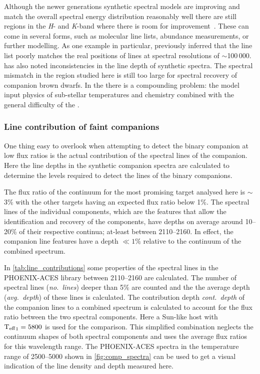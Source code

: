 
Although the newer generations synthetic spectral models are improving and match the overall spectral energy distribution reasonably well there are still regions in the \emph{H}- and \emph{K}-band where there is room for improvement~\citet{rajpurohit_spectral_2016}.
These can come in several forms, such as molecular line lists, abundance measurements, or further modelling.
As one example in particular, \citet{rajpurohit_spectral_2016} previously inferred that the  line list poorly matches the real positions of  lines at spectral resolutions of \(\sim\)100\,000.
\citet{passegger_carmenes_2018} has also noted inconsistencies in the line depth of synthetic spectra.
The spectral mismatch in the region studied here is still too large for spectral recovery of companion brown dwarfs.
In the \nir{} there is a compounding problem: the model input physics of sub-stellar temperatures and chemistry combined with the general difficulty of the \nir{}.

\subsubsection{Line contribution of faint companions}
\label{subsubsec:line_contributions}
One thing easy to overlook when attempting to detect the binary companion at low flux ratios is the actual contribution of the spectral lines of the companion.
Here the line depths in the synthetic companion spectra are calculated to determine the \snr{} levels required to detect the lines of the binary companions.

The flux ratio of the continuum for the most promising target analysed here is \FtwoFone{}\(\sim\)3\% with the other targets having an expected flux ratio below 1\%.
The spectral lines of the individual components, which are the features that allow the identification and recovery of the components, have depths on average around 10--20\% of their respective continua; at-least between 2110--2160\nm{}.
In effect, the companion line features have a depth \(\ll 1\%\) relative to the continuum of the combined spectrum.

In \cref{tab:line_contributions} some properties of the spectral lines in the {PHOENIX-ACES} library between 2110--2160\nm{} are calculated.
The number of spectral lines (\emph{no.~lines}) deeper than 5\% are counted and the the average depth (\emph{avg.~depth}) of these lines is calculated.
The contribution depth \emph{cont.~depth} of the companion lines to a combined spectrum is calculated to account for the flux ratio between the two spectral components.
Here a Sun-like host with \({\textrm{T}_{\mathrm{eff}}}_{1}=5800\)\K{} is used for the comparison.
This simplified combination neglects the continuum shapes of both spectral components and uses the average flux ratios for this wavelength range.
The {PHOENIX-ACES} spectra in the temperature range of 2500--5000\K{} shown in \cref{fig:comp_spectra} can be used to get a visual indication of the line density and depth measured here.


